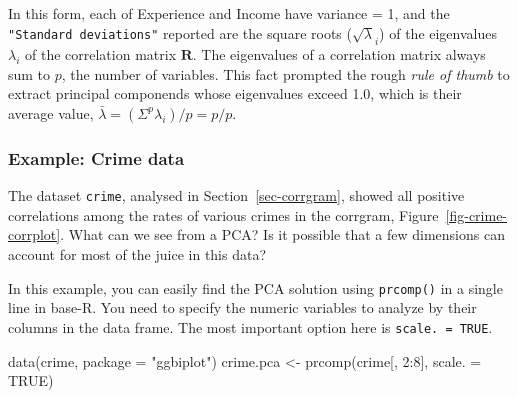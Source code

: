 \documentclass[
  letterpaper,
  10pt,
  krantz2]{krantz}
\makeatletter
\newenvironment{Shaded}{\begin{snugshade}}{\end{snugshade}}
\newcommand{\AttributeTok}[1]{\textcolor[rgb]{0.40,0.45,0.13}{#1}}
\newcommand{\CommentTok}[1]{\textcolor[rgb]{0.37,0.37,0.37}{#1}}
\newcommand{\ConstantTok}[1]{\textcolor[rgb]{0.56,0.35,0.01}{#1}}
\newcommand{\DecValTok}[1]{\textcolor[rgb]{0.68,0.00,0.00}{#1}}
\newcommand{\FunctionTok}[1]{\textcolor[rgb]{0.28,0.35,0.67}{#1}}
\newcommand{\NormalTok}[1]{\textcolor[rgb]{0.00,0.23,0.31}{#1}}
\newcommand{\OtherTok}[1]{\textcolor[rgb]{0.00,0.23,0.31}{#1}}
\newcommand{\SpecialCharTok}[1]{\textcolor[rgb]{0.37,0.37,0.37}{#1}}
\newcommand{\StringTok}[1]{\textcolor[rgb]{0.13,0.47,0.30}{#1}}
\newenvironment{kframe}{%
  \medskip{}
  \setlength{\fboxsep}{.8em}
  \def\at@end@of@kframe{}%
  \ifinner\ifhmode%
  \def\at@end@of@kframe{\end{minipage}}%
  \begin{minipage}{\columnwidth}%
  \fi\fi%
  \def\FrameCommand##1{\hskip\@totalleftmargin \hskip-\fboxsep
  \colorbox{shadecolor}{##1}\hskip-\fboxsep
      \hskip-\linewidth \hskip-\@totalleftmargin \hskip\columnwidth}%
  \MakeFramed {\advance\hsize-\width
    \@totalleftmargin\z@ \linewidth\hsize
    \@setminipage}}%
{\par\unskip\endMakeFramed%
  \at@end@of@kframe}
\renewenvironment{Shaded}{\begin{kframe}}{\end{kframe}}
\makeatother
\begin{document}
In this form, each of Experience and Income have variance = 1, and the
\texttt{"Standard\ deviations"} reported are the square roots
(\(\sqrt{\lambda}_i\)) of the eigenvalues \(\lambda_i\) of the
correlation matrix \(\mathbf{R}\). The eigenvalues of a correlation
matrix always sum to \(p\), the number of variables. This fact prompted
the rough \emph{rule of thumb} to extract principal componends whose
eigenvalues exceed 1.0, which is their average value,
\(\bar{\lambda} = (\Sigma^p \lambda_i) / p = p / p\).

\begin{Shaded}
\end{Shaded}

\subsubsection*{Example: Crime data}\label{example-crime-data}

The dataset \texttt{crime}, analysed in Section~\ref{sec-corrgram},
showed all positive correlations among the rates of various crimes in
the corrgram, Figure~\ref{fig-crime-corrplot}. What can we see from a
PCA? Is it possible that a few dimensions can account for most of the
juice in this data?

In this example, you can easily find the PCA solution using
\texttt{prcomp()} in a single line in base-R. You need to specify the
numeric variables to analyze by their columns in the data frame. The
most important option here is \texttt{scale.\ =\ TRUE}.

\begin{Shaded}
\begin{Highlighting}[]
\FunctionTok{data}\NormalTok{(crime, }\AttributeTok{package =} \StringTok{"ggbiplot"}\NormalTok{)}
\NormalTok{crime.pca }\OtherTok{\textless{}{-}} \FunctionTok{prcomp}\NormalTok{(crime[, }\DecValTok{2}\SpecialCharTok{:}\DecValTok{8}\NormalTok{], }\AttributeTok{scale. =} \ConstantTok{TRUE}\NormalTok{)}
\end{Highlighting}
\end{Shaded}
\end{document}
